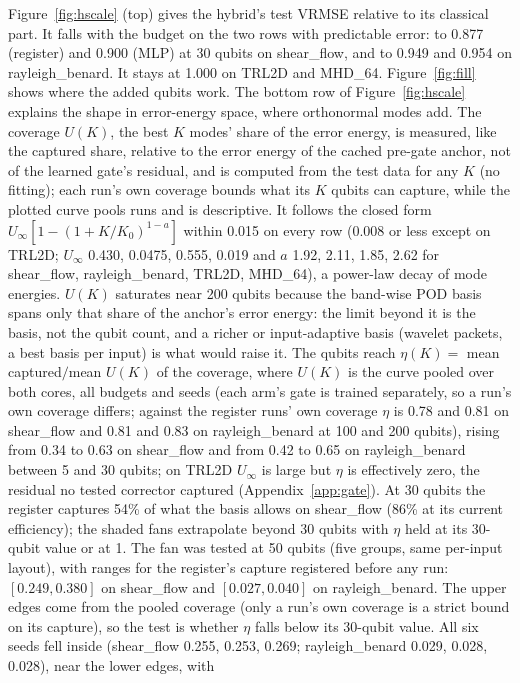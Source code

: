 \documentclass{article}
\begin{document}
Figure~\ref{fig:hscale} (top) gives the hybrid's test VRMSE relative to its classical part. It falls with the budget
on the two rows with predictable error: to 0.877 (register) and 0.900 (MLP) at 30 qubits on shear\_flow, and to 0.949
and 0.954 on rayleigh\_benard. It stays at 1.000 on TRL2D and MHD\_64. Figure~\ref{fig:fill} shows where the added qubits work. The bottom row of Figure~\ref{fig:hscale} explains the shape in error-energy space,
where orthonormal modes add. The coverage $U(K)$, the best $K$ modes' share of the error energy, is
measured, like the captured share, relative to the error energy of the cached pre-gate anchor, not of the learned
gate's residual, and is computed from the test data for any $K$ (no fitting); each run's own coverage bounds what its $K$ qubits can capture, while
the plotted curve pools runs and is descriptive. It follows the closed form
$U_\infty[1-(1+K/K_0)^{1-a}]$ within 0.015 on every row (0.008 or less except on TRL2D; $U_\infty$ 0.430, 0.0475, 0.555, 0.019 and $a$ 1.92, 2.11, 1.85,
2.62 for shear\_flow, rayleigh\_benard, TRL2D, MHD\_64), a power-law decay of mode energies. $U(K)$ saturates near 200
qubits because the band-wise POD basis spans only that share of the anchor's error energy: the limit beyond it is the basis, not the
qubit count, and a richer or input-adaptive basis (wavelet packets, a best basis per input) is what would raise it.
The qubits reach $\eta(K)=$ mean captured$/$mean $U(K)$ of the coverage, where $U(K)$ is the curve pooled over both
cores, all budgets and seeds (each arm's gate is trained separately, so a run's own coverage differs; against the
register runs' own coverage $\eta$ is 0.78 and 0.81 on shear\_flow and 0.81 and 0.83 on rayleigh\_benard at 100 and 200
qubits), rising from 0.34 to 0.63 on shear\_flow and from 0.42 to
0.65 on rayleigh\_benard between 5 and 30 qubits; on TRL2D $U_\infty$ is large but $\eta$ is effectively zero, the residual no tested corrector
captured (Appendix~\ref{app:gate}). At 30 qubits the register captures 54\% of what the basis allows on shear\_flow (86\% at its
current efficiency); the shaded fans extrapolate beyond 30 qubits with $\eta$ held at its 30-qubit value or at 1.
The fan was tested at 50 qubits (five groups, same per-input layout), with ranges for the register's capture
registered before any run: $[0.249, 0.380]$ on shear\_flow and $[0.027, 0.040]$ on rayleigh\_benard. The upper edges
come from the pooled coverage (only a run's own coverage is a strict bound on its capture), so the test is whether $\eta$ falls below its 30-qubit value. All six
seeds fell inside (shear\_flow 0.255, 0.253, 0.269; rayleigh\_benard 0.029, 0.028, 0.028), near the lower edges, with
\end{document}
